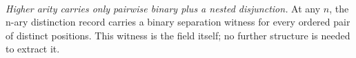 \documentclass[11pt]{article}
\begin{document}
\begin{code}
\\
%
\>[2]\AgdaSymbol{;}\AgdaSpace{}%
%
\>[20]\AgdaSymbol{=}\AgdaSpace{}%
\AgdaSpace{}%
\AgdaBound{\AgdaUnderscore{}}\AgdaSpace{}%
\AgdaSpace{}%
\<%
\\
%
\>[2]\AgdaSymbol{;}\AgdaSpace{}%
%
\>[20]\AgdaSymbol{=}\AgdaSpace{}%
\AgdaSpace{}%
\AgdaBound{\AgdaUnderscore{}}\AgdaSpace{}%
\AgdaSpace{}%
\<%
\\
%
\>[2]\AgdaSymbol{;}\AgdaSpace{}%
\AgdaSpace{}%
\AgdaSymbol{=}\AgdaSpace{}%
\AgdaSpace{}%
\AgdaBound{\AgdaUnderscore{}}\AgdaSpace{}%
\AgdaSpace{}%
\<%
\\
%
\>[2]\AgdaSymbol{;}\AgdaSpace{}%
\AgdaSpace{}%
\AgdaSymbol{=}\AgdaSpace{}%
\AgdaSpace{}%
\AgdaBound{\AgdaUnderscore{}}\AgdaSpace{}%
\AgdaSpace{}%
\<%
\\
%
\>[2]\AgdaSymbol{;}\AgdaSpace{}%
\AgdaSpace{}%
\AgdaSymbol{=}\AgdaSpace{}%
\AgdaSpace{}%
\AgdaBound{\AgdaUnderscore{}}\AgdaSpace{}%
\AgdaSpace{}%
\<%
\\
%
\>[2]\AgdaSymbol{\}}\<%
\end{code}

\emph{Higher arity carries only pairwise binary plus a nested
disjunction.}  At any $n$, the n-ary distinction record carries a
binary separation witness for every ordered pair of distinct
positions.  This witness is the  field itself; no
further structure is needed to extract it.
\end{document}

